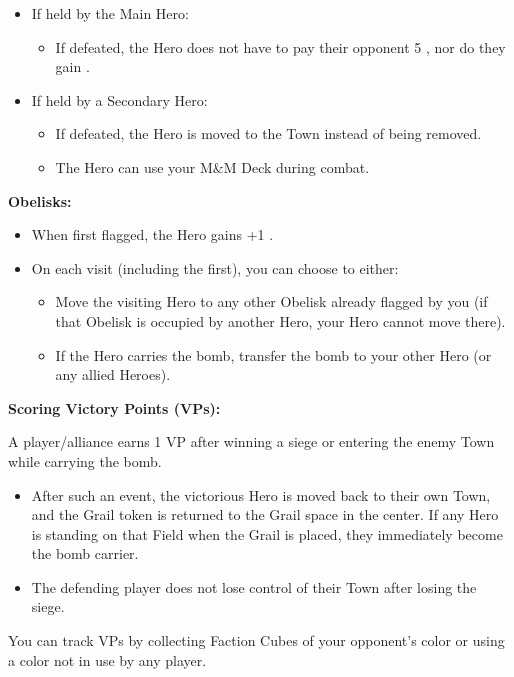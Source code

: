 \begin{multicols}{2}
\begin{itemize}
  \item If held by the Main Hero:
  \begin{itemize}
    \item If defeated, the Hero does not have to pay their opponent 5 , nor do they gain .
  \end{itemize}

  \item If held by a Secondary Hero:
  \begin{itemize}
    \item If defeated, the Hero is moved to the Town instead of being removed.
    \item The Hero can use your M\&M Deck during combat.
  \end{itemize}
\end{itemize}

\textbf{Obelisks:}

\begin{itemize}
  \item When first flagged, the Hero gains +1 .
  \item On each visit (including the first), you can choose to either:
  \begin{itemize}
    \item Move the visiting Hero to any other Obelisk already flagged by you (if that Obelisk is occupied by another Hero, your Hero cannot move there).
    \item If the Hero carries the bomb, transfer the bomb to your other Hero (or any allied Heroes).
  \end{itemize}
\end{itemize}

\textbf{Scoring Victory Points (VPs):}

A player/alliance earns 1 VP after winning a siege or entering the enemy Town while carrying the bomb.
\begin{itemize}
  \item After such an event, the victorious Hero is moved back to their own Town, and the Grail token is returned to the Grail space in the center. If any Hero is standing on that Field when the Grail is placed, they immediately become the bomb carrier.
  \item The defending player does not lose control of their Town after losing the siege.
\end{itemize}

You can track VPs by collecting Faction Cubes of your opponent's color or using a color not in use by any player.

\end{multicols}

